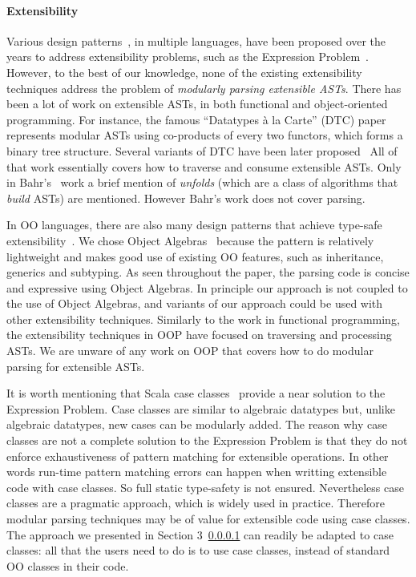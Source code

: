 \paragraph{Extensibility} Various design patterns~\cite{}, in multiple
languages, have been proposed over the years to address extensibility
problems, such as the Expression Problem~\cite{}. However, to the best
of our knowledge, none of the existing extensibility techniques
address the problem of \emph{modularly
parsing extensible ASTs}.  There has been
a lot of work on extensible ASTs, in both functional and
object-oriented programming.  For instance, the famous ``Datatypes \`a
la Carte'' (DTC)
paper~\cite{swierstra2008data} represents modular ASTs using co-products
of every two functors, which forms a binary tree structure.
Several variants of DTC have been later proposed~\cite{Bahr2011,Bahr2014,Oliveira2015}
All of that work essentially covers how to traverse and
consume extensible ASTs.
Only in Bahr's~\cite{Bahr2011} work a brief mention of \emph{unfolds}
(which are a class of algorithms that \emph{build} ASTs) are mentioned.
However Bahr's work does not cover parsing.

In OO languages, there are also many design patterns that achieve
type-safe extensibility~\cite{torgerson,odersky,Oliveira09,Oliveira12,Wang16}.
We chose Object Algebras~\cite{Oliveira2012} because the pattern is
relatively lightweight and makes good use of existing OO features,
such as inheritance, generics and subtyping. As seen throughout the paper,
the parsing code is concise and expressive using Object Algebras.
In principle our approach is not coupled to the use of Object
Algebras, and variants of our approach could be used with other
extensibility techniques. Similarly to the work in functional
programming, the extensibility techniques in OOP have focused
on traversing and processing ASTs. We are unware of any work on OOP
that covers how to do modular parsing for extensible ASTs.

It is worth mentioning that Scala case classes~\cite{} provide a near
solution to the Expression Problem. Case classes are similar to
algebraic datatypes but, unlike algebraic datatypes, new cases can be
modularly added. The reason why case classes are not a complete
solution to the Expression Problem is that they do not enforce
exhaustiveness of pattern matching for extensible operations. In other
words run-time pattern matching errors can happen when writting
extensible code with case classes.  So full static type-safety is not
ensured. Nevertheless case classes are a pragmatic approach, which is
widely used in practice. Therefore modular parsing techniques may be
of value for extensible code using case classes.  The approach we
presented in Section 3~\ref{} can readily be adapted to case classes:
all that the users need to do is to use case classes, instead of
standard OO classes in their code.

